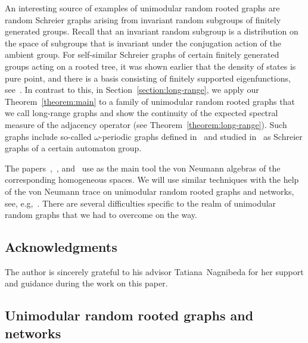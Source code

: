 \documentclass[english]{article}
\theoremstyle{definition}
\begin{document}
An interesting source of examples of unimodular random rooted graphs are random Schreier graphs arising from invariant random subgroups of finitely generated groups. Recall that an invariant random subgroup is a distribution on the space of subgroups that is invariant under the conjugation action of the ambient group.
For self-similar Schreier graphs of certain finitely generated groups acting on a rooted tree, it was shown earlier that the density of states is pure point, and there is a basis consisting of finitely supported eigenfunctions, see~\cite{BGJRT, GNP, Tep_serpinski}.  
In contrast to this, in Section~\ref{section:long-range}, we apply our Theorem~\ref{theorem:main} to a family of unimodular random rooted graphs that we call long-range graphs and show the continuity of the expected spectral measure of the adjacency operator (see Theorem~\ref{theorem:long-range}). Such graphs include so-called $\omega$-periodic graphs defined in~\cite{BH} and studied in~\cite{BCDN} as Schreier graphs of a certain automaton group.

The papers~\cite{El},~\cite{GP}, and~\cite{LV} use as the main tool the von Neumann algebras of the corresponding homogeneous spaces. We will use similar techniques with the help of the von Neumann trace on unimodular random rooted graphs and networks, see, e.g,~\cite{AL07}. There are several difficulties specific to the realm of unimodular random graphs that we had to overcome on the way. 

\subsection*{Acknowledgments} The author is sincerely grateful to his advisor Tatiana~Nagnibeda for her support and guidance during the work on this paper. 

\subsection{Unimodular random rooted graphs and networks}
\end{document}
